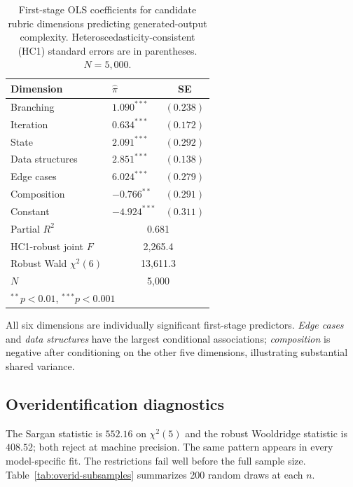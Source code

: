 \documentclass{article}
\begin{document}
\begin{table}[h]
\centering
\caption{First-stage OLS coefficients for candidate rubric dimensions predicting generated-output complexity. Heteroscedasticity-consistent (HC1) standard errors are in parentheses. $N=5{,}000$.}
\label{tab:stage1}
\begin{tabular}{@{}llc@{}}
\toprule
Dimension & $\hat{\pi}$ & SE \\
\midrule
Branching        & $1.090^{***}$  & $(0.238)$ \\
Iteration        & $0.634^{***}$  & $(0.172)$ \\
State            & $2.091^{***}$  & $(0.292)$ \\
Data structures  & $2.851^{***}$  & $(0.138)$ \\
Edge cases       & $6.024^{***}$  & $(0.279)$ \\
Composition      & $-0.766^{**}$  & $(0.291)$ \\
Constant         & $-4.924^{***}$ & $(0.311)$ \\
\midrule
Partial $R^2$                & \multicolumn{2}{c}{0.681} \\
HC1-robust joint $F$         & \multicolumn{2}{c}{2{,}265.4} \\
Robust Wald $\chi^2(6)$      & \multicolumn{2}{c}{13{,}611.3} \\
$N$                          & \multicolumn{2}{c}{5{,}000} \\
\bottomrule
\multicolumn{3}{l}{\footnotesize $^{**}p<0.01$, $^{***}p<0.001$}
\end{tabular}
\end{table}

All six dimensions are individually significant first-stage predictors. \emph{Edge cases} and \emph{data structures} have the largest conditional associations; \emph{composition} is negative after conditioning on the other five dimensions, illustrating substantial shared variance.

\subsection{Overidentification diagnostics}

The Sargan statistic is $552.16$ on $\chi^2(5)$ and the robust Wooldridge statistic is $408.52$; both reject at machine precision. The same pattern appears in every model-specific fit. The restrictions fail well before the full sample size. Table~\ref{tab:overid-subsamples} summarizes 200 random draws at each $n$.
\end{document}
